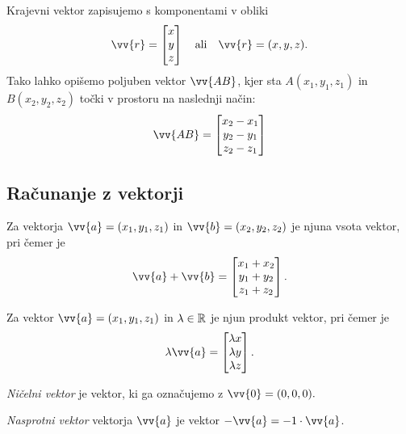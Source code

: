 \documentclass[12pt, a4paper]{article}
\begin{document}
Krajevni vektor zapisujemo s komponentami v obliki
\[
\vv{r}=
\begin{bmatrix}
x \\
y \\
z
\end{bmatrix}
\quad\text{ali}\quad
\vv{r}=(x,y,z).
\]
Tako lahko opišemo poljuben vektor $\vv{AB}$, kjer sta $A(x_1,y_1,z_1)$ in $B(x_2,y_2,z_2)$ točki v prostoru na naslednji način:
\[
\vv{AB}=
\begin{bmatrix}
x_2-x_1 \\
y_2-y_1 \\
z_2-z_1
\end{bmatrix}
\]

\newpage

\subsection{Računanje z vektorji}

\begin{definicija}
Za vektorja $\vv{a}=(x_1,y_1,z_1)$ in $\vv{b}=(x_2,y_2,z_2)$  je njuna vsota vektor, pri čemer je
\[
\vv{a}+\vv{b}=
\begin{bmatrix}
x_1+x_2 \\
y_1+y_2 \\
z_1+z_2
\end{bmatrix}.
\]
\end{definicija}

\begin{definicija}
Za vektor $\vv{a}=(x_1,y_1,z_1)$ in $\lambda\in\mathbb{R}$ je njun produkt vektor, pri čemer je
\[\lambda\vv{a}=
\begin{bmatrix}
\lambda x \\
\lambda y \\
\lambda z
\end{bmatrix}.
\]
\end{definicija}

\begin{definicija}
\emph{Ničelni vektor} je vektor, ki ga označujemo z $\vv{0}=(0,0,0).$
\end{definicija}

\begin{definicija}
\emph{Nasprotni vektor} vektorja $\vv{a}$ je vektor $-\vv{a}=-1\cdot\vv{a}$.
\end{definicija}
\end{document}
